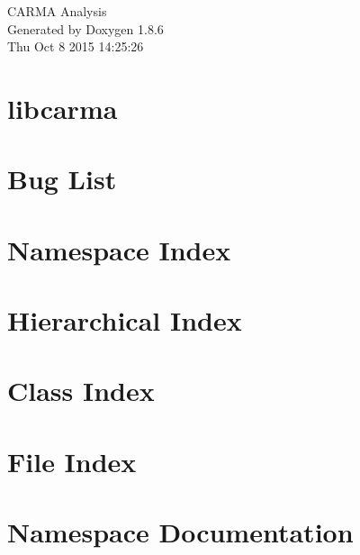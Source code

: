 \documentclass[twoside]{book}
\newcommand{\clearemptydoublepage}{%
  \newpage{\pagestyle{empty}\cleardoublepage}%
}
\begin{document}
\hypersetup{pageanchor=false}
\begin{titlepage}
\vspace*{7cm}
\begin{center}%
{\Large C\-A\-R\-M\-A Analysis }\\
\vspace*{1cm}
{\large Generated by Doxygen 1.8.6}\\
\vspace*{0.5cm}
{\small Thu Oct 8 2015 14:25:26}\\
\end{center}
\end{titlepage}
\clearemptydoublepage
\tableofcontents
\clearemptydoublepage
{}
\hypersetup{pageanchor=true}

\chapter{libcarma}
\label{md__home_vish_code_trunk_cpp_libcarma__r_e_a_d_m_e}
\hypertarget{md__home_vish_code_trunk_cpp_libcarma__r_e_a_d_m_e}{}

\chapter{Bug List}
\label{bug}
\hypertarget{bug}{}

\chapter{Namespace Index}

\chapter{Hierarchical Index}

\chapter{Class Index}

\chapter{File Index}

\chapter{Namespace Documentation}






\end{document}
